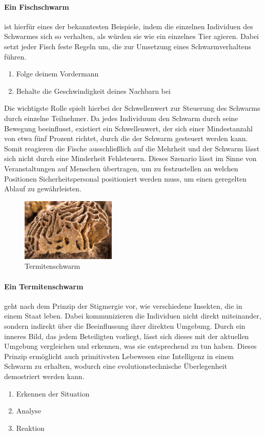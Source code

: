 \paragraph{Ein Fischschwarm}
ist hierfür eines der bekanntesten Beispiele, indem die einzelnen Individuen des Schwarmes sich so verhalten, als würden sie wie ein einzelnes Tier agieren. Dabei setzt jeder Fisch feste Regeln um, die zur Umsetzung eines Schwarmverhaltens führen.\\
\begin{enumerate}
	\item Folge deinem Vordermann
	\item Behalte die Geschwindigkeit deines Nachbarn bei
\end{enumerate}
\noindent
Die wichtigste Rolle spielt hierbei der Schwellenwert zur Steuerung des Schwarms durch einzelne Teilnehmer. Da jedes Individuum den Schwarm durch seine Bewegung beeinflusst, existiert ein Schwellenwert, der sich einer Mindestanzahl von etwa fünf Prozent richtet, durch die der Schwarm gesteuert werden kann. Somit reagieren die Fische ausschließlich auf die Mehrheit und der Schwarm lässt sich nicht durch eine Minderheit Fehlsteuern. Dieses Szenario lässt im Sinne von Veranstaltungen auf Menschen übertragen, um zu festzustellen an welchen Positionen Sicherheitspersonal positioniert werden muss, um einen geregelten Ablauf zu gewährleisten.

\begin{figure}
	\begin{center}
		\includegraphics[width=0.4\textwidth]{images/technische_grundlagen/termitenschwarm.jpg}
	\end{center}
	\caption{Termitenschwarm}
	\label{fig:termitenschwarm}
\end{figure}

\noindent
\paragraph{Ein Termitenschwarm} geht nach dem Prinzip der Stigmergie vor, wie verschiedene Insekten, die in einem Staat leben. Dabei kommunizieren die Individuen nicht direkt miteinander, sondern indirekt über die Beeinflussung ihrer direkten Umgebung. Durch ein inneres Bild, das jedem Beteiligten vorliegt, lässt sich dieses mit der aktuellen Umgebung vergleichen und erkennen, was sie entsprechend zu tun haben. Dieses Prinzip ermöglicht auch primitivsten Lebewesen eine Intelligenz in einem Schwarm zu erhalten, wodurch eine evolutionstechnische Überlegenheit demostriert werden kann.
\begin{enumerate}
	\item Erkennen der Situation
	\item Analyse
	\item Reaktion
\end{enumerate}

